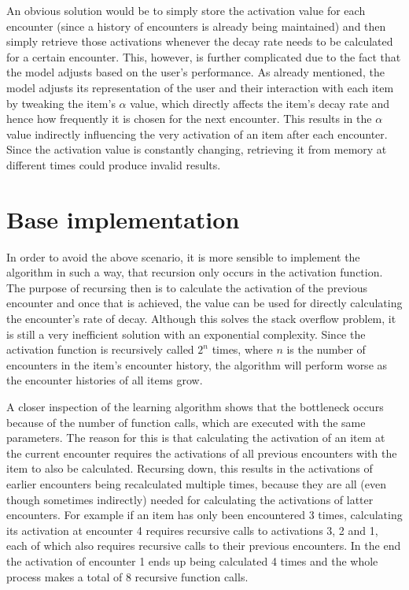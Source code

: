 \documentclass[a4paper]{report}
\begin{document}
An obvious solution would be to simply store the activation value for each encounter (since a history of encounters is already being maintained) and then simply retrieve those activations whenever the decay rate needs to be calculated for a certain encounter. This, however, is further complicated due to the fact that the model adjusts based on the user's performance. As already mentioned, the model adjusts its representation of the user and their interaction with each item by tweaking the item's $\alpha$ value, which directly affects the item's decay rate and hence how frequently it is chosen for the next encounter. This results in the $\alpha$ value indirectly influencing the very activation of an item after each encounter. Since the activation value is constantly changing, retrieving it from memory at different times could produce invalid results.

\section{Base implementation}
In order to avoid the above scenario, it is more sensible to implement the algorithm in such a way, that recursion only occurs in the activation function. The purpose of recursing then is to calculate the activation of the previous encounter and once that is achieved, the value can be used for directly calculating the encounter's rate of decay. Although this solves the stack overflow problem, it is still a very inefficient solution with an exponential complexity. Since the activation function is recursively called $2^n$ times, where $n$ is the number of encounters in the item's encounter history, the algorithm will perform worse as the encounter histories of all items grow. \citep{sipser12}

A closer inspection of the learning algorithm shows that the bottleneck \citep{wescott13} occurs because of the number of function calls, which are executed with the same parameters. The reason for this is that calculating the activation of an item at the current encounter requires the activations of all previous encounters with the item to also be calculated. Recursing down, this results in the activations of earlier encounters being recalculated multiple times, because they are all (even though sometimes indirectly) needed for calculating the activations of latter encounters. For example if an item has only been encountered 3 times, calculating its activation at encounter 4 requires recursive calls to activations 3, 2 and 1, each of which also requires recursive calls to their previous encounters. In the end the activation of encounter 1 ends up being calculated 4 times and the whole process makes a total of 8 recursive function calls.
\end{document}

